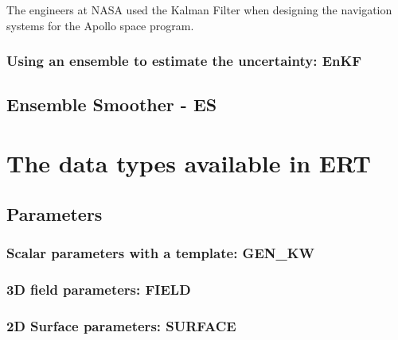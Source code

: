 \documentclass[a4paper,10pt,english]{sphinxmanual}
\begin{document}
\begin{figure}[htbp]
\centering

\noindent{}
\end{figure}

The engineers at NASA used the Kalman Filter when designing the navigation
systems for the Apollo space program.


\subsection{Using an ensemble to estimate the uncertainty: EnKF}
\label{\detokenize{introduction/index:using-an-ensemble-to-estimate-the-uncertainty-enkf}}

\section{Ensemble Smoother - ES}
\label{\detokenize{introduction/index:ensemble-smoother-es}}

\chapter{The data types available in ERT}
\label{\detokenize{data_types/index:the-data-types-available-in-ert}}\label{\detokenize{data_types/index::doc}}

\section{Parameters}
\label{\detokenize{data_types/index:parameters}}

\subsection{Scalar parameters with a template: GEN\_KW}
\label{\detokenize{data_types/index:scalar-parameters-with-a-template-gen-kw}}

\subsection{3D field parameters: FIELD}
\label{\detokenize{data_types/index:d-field-parameters-field}}

\subsection{2D Surface parameters: SURFACE}
\label{\detokenize{data_types/index:d-surface-parameters-surface}}
\end{document}

